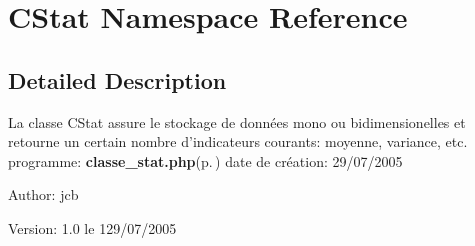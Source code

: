 \section{CStat Namespace Reference}
\label{namespaceCStat}




\subsection{Detailed Description}
La classe CStat assure le stockage de donn\'{e}es mono ou bidimensionelles et retourne un certain nombre d'indicateurs courants: moyenne, variance, etc. programme: {\bf classe\_\-stat.php}{\rm (p.\,\pageref{classe__stat_8php})} date de cr\'{e}ation: 29/07/2005 \begin{Desc}
\item[Author:]jcb \end{Desc}
\begin{Desc}
\item[Version:]1.0  le 129/07/2005 \end{Desc}


